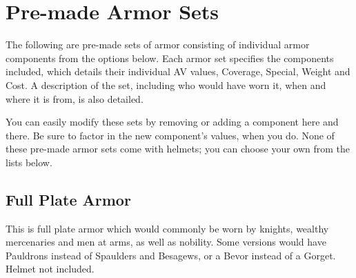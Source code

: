 \documentclass[oneside,11pt,english]{book}
\begin{document}
\section{Pre-made Armor Sets}
The following are pre-made sets of armor consisting of individual armor components from the options below. Each 
armor set specifies the components included, which details their individual AV values, Coverage, Special, Weight and 
Cost. A description of the set, including who would have worn it, when and where it is from, is also detailed. 

You can easily modify these sets by removing or adding a component here and there. Be sure to factor in the new component’s values, when you do. None of these pre-made armor sets come with helmets; you can choose your own from the lists below.

\subsection*{Full Plate Armor}
This is full plate armor which would commonly be worn by knights, wealthy mercenaries and men at arms, as well as 
nobility. Some versions would have Pauldrons instead of Spaulders and Besagews, or a Bevor instead of a Gorget.
Helmet not included.
\end{document}
